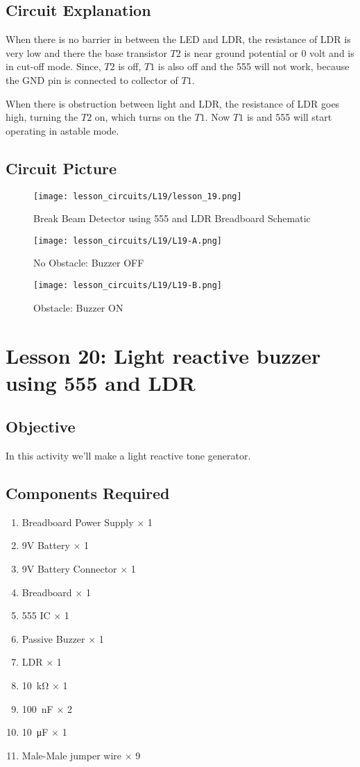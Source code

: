 \subsection{Circuit Explanation}
When there is no barrier in between the LED and LDR, the resistance of LDR is very low and there the base transistor $T2$ is near 
ground potential or 0 volt and is in cut-off mode. Since, $T2$ is off, $T1$ is also off and the 555 will not work, because the GND 
pin is connected to collector of $T1$.

When there is obstruction between light and LDR, the resistance of LDR goes high, turning the $T2$ on, which turns on the $T1$. 
Now $T1$ is and 555 will start operating in astable mode.
\subsection{Circuit Picture}
\begin{figure}[!htp]
    \centering
    \texttt{[image: lesson\_circuits/L19/lesson\_19.png]}
    \caption{Break Beam Detector using 555 and LDR Breadboard Schematic}
    \label{fig:555_bbdet_sch}
\end{figure}
\begin{figure}[!htp]
    \centering
    \texttt{[image: lesson\_circuits/L19/L19-A.png]}
    \caption{No Obstacle: Buzzer OFF}
    \label{fig:555_bbdet_obb}
\end{figure}
\begin{figure}[!htp]
    \centering
    \texttt{[image: lesson\_circuits/L19/L19-B.png]}
    \caption{Obstacle: Buzzer ON}
    \label{fig:555_bbdet_obb1}
\end{figure}
\section{Lesson 20: Light reactive buzzer using 555 and LDR}
\subsection{Objective}
In this activity we'll make a light reactive tone generator.
\subsection{Components Required}
\begin{enumerate}
    \item Breadboard Power Supply $\times$ 1
    \item 9V Battery $\times$ 1
    \item 9V Battery Connector $\times$ 1
    \item Breadboard $\times$ 1
    \item 555 IC $\times$ 1
    \item Passive Buzzer $\times$ 1
    \item LDR $\times$ 1
    \item \SI{10}{\kilo\ohm} $\times$ 1
    \item \SI{100}{\nano\farad} $\times$ 2
    \item \SI{10}{\micro\farad} $\times$ 1
    \item Male-Male jumper wire $\times$ 9
\end{enumerate}
